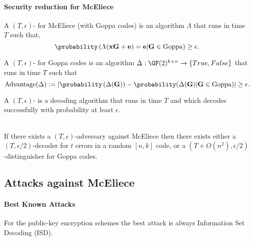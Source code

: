 \documentclass[a4paper, 11pt, openany]{book}
\begin{document}
\paragraph{Security reduction for McEliece}
A $(T, \epsilon)$- for McEliece (with Goppa codes) is an algorithm $\Lambda$ that runs in time $T$ such that,
\[
	\probability \left( \Lambda( {\bf x} {\bf G} + {\bf e} ) = {\bf e} | {\bf G} \in \text{Goppa} \right) \ge \epsilon.
\]

A $(T, \epsilon)$- for Goppa codes is an algorithm $\Delta : \GF(2)^{k \times n} \to \{ True, False \}$ that runs in time $T$ such that
\[
	\mathrm{Advantage}(\Delta) := \left| \probability \left( \Delta({\bf G}) ) - \probability( \Delta({\bf G}) | {\bf G} \in \text{Goppa} \right) \right| \ge \epsilon.
\]

A $(T, \epsilon)$- is a decoding algorithm that runs in time $T$ and which decodes successfully with probability at least $\epsilon$.\\
~\\
\begin{theorem}
If there exists a $(T, \epsilon)$-adversary against McEliece then there
exists either a $(T, \epsilon/2)$-decoder for $t$ errors in a random $[n, k]$ code,
or a $(T +O(n^2), \epsilon/2)$-distinguisher for Goppa codes.
\end{theorem}


\subsection{Attacks against McEliece}


%
%
%
%
%
%
%
%



\paragraph{Best Known Attacks}
 For the public-key encryption schemes the best
attack is always Information Set Decoding (ISD).
\end{document}
